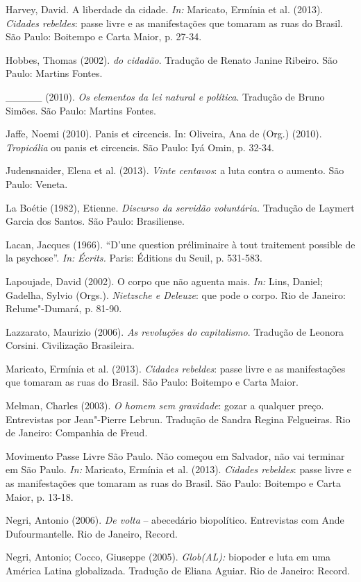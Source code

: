 Harvey, David. A liberdade da cidade. \emph{In: }Maricato, Ermínia et
al. (2013). \emph{Cidades rebeldes}: passe livre e as manifestações que
tomaram as ruas do Brasil. São Paulo: Boitempo e Carta Maior, p. 27-34.

Hobbes, Thomas (2002). \emph{do cidadão}. Tradução de Renato Janine
Ribeiro. São Paulo: Martins Fontes.

\_\_\_\_\_ (2010). \emph{Os elementos da lei natural e política}.
Tradução de Bruno Simões. São Paulo: Martins Fontes.

Jaffe, Noemi (2010). Panis et circencis. In: Oliveira, Ana de (Org.)
(2010). \emph{Tropicália }ou panis et circencis. São Paulo: Iyá Omin, p.
32-34.

Judensnaider, Elena et al. (2013). \emph{Vinte centavos}: a luta contra
o aumento. São Paulo: Veneta.

La Boétie (1982), Etienne. \emph{Discurso da servidão voluntária.
}Tradução de Laymert Garcia dos Santos. São Paulo: Brasiliense.

Lacan, Jacques (1966). ``D'une question préliminaire à tout traitement
possible de la psychose''. \emph{In:} \emph{Écrits. }Paris: Éditions du
Seuil, p. 531-583.

Lapoujade, David (2002). O corpo que não aguenta mais. \emph{In: }Lins,
Daniel; Gadelha, Sylvio (Orgs.).\emph{ Nietzsche e Deleuze}: que pode o
corpo. Rio de Janeiro: Relume"-Dumará, p. 81-90.

Lazzarato, Maurizio (2006). \emph{As revoluções do capitalismo}.
Tradução de Leonora Corsini. Civilização Brasileira.

Maricato, Ermínia et al. (2013). \emph{Cidades rebeldes}: passe livre e
as manifestações que tomaram as ruas do Brasil. São Paulo: Boitempo e
Carta Maior.

Melman, Charles (2003). \emph{O homem sem gravidade}: gozar a qualquer
preço. Entrevistas por Jean"-Pierre Lebrun. Tradução de Sandra Regina
Felgueiras. Rio de Janeiro: Companhia de Freud.

Movimento Passe Livre São Paulo. Não começou em Salvador, não vai
terminar em São Paulo. \emph{In: }Maricato, Ermínia et al. (2013).
\emph{Cidades rebeldes}: passe livre e as manifestações que tomaram as
ruas do Brasil. São Paulo: Boitempo e Carta Maior, p. 13-18.

Negri, Antonio (2006). \emph{De volta }-- abecedário biopolítico.
Entrevistas com Ande Dufourmantelle. Rio de Janeiro, Record.

Negri, Antonio; Cocco, Giuseppe (2005). \emph{Glob(AL): }biopoder e luta
em uma América Latina globalizada. Tradução de Eliana Aguiar. Rio de
Janeiro: Record.


